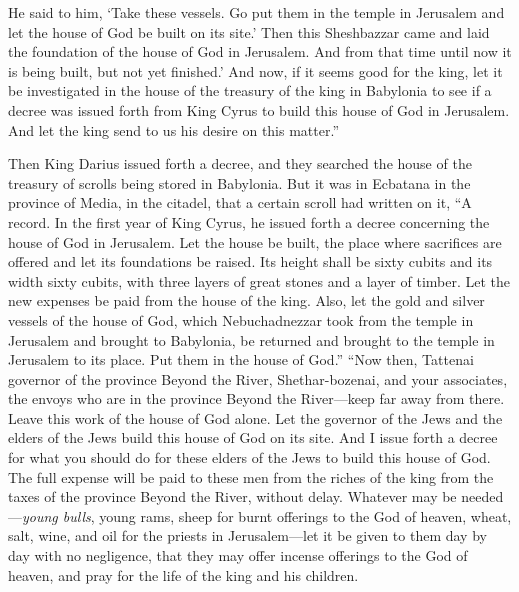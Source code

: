 \begin{biblechapter}
\verse He said to him, ‘Take these vessels. Go put them in the temple in Jerusalem and let the house of God be built on its site.’
\verse Then this Sheshbazzar came and laid the foundation of the house of God in Jerusalem. And from that time until now it is being built, but not yet finished.’
\verse And now, if it seems good for the king, let it be investigated in the house of the treasury of the king in Babylonia to see if a decree was issued forth from King Cyrus to build this house of God in Jerusalem. And let the king send to us his desire on this matter.”
\end{biblechapter}

\begin{biblechapter} %
 Then King Darius issued forth a decree, and they searched the house of the treasury of scrolls being stored in Babylonia.
\verse But it was in Ecbatana in the province of Media, in the citadel, that a certain scroll had written on it, “A record.
\verse In the first year of King Cyrus, he issued forth a decree concerning the house of God in Jerusalem. Let the house be built, the place where sacrifices are offered and let its foundations be raised. Its height shall be sixty cubits and its width sixty cubits,
\verse with three layers of great stones and a layer of timber. Let the new expenses be paid from the house of the king.
\verse Also, let the gold and silver vessels of the house of God, which Nebuchadnezzar took from the temple in Jerusalem and brought to Babylonia, be returned and brought to the temple in Jerusalem to its place. Put them in the house of God.”
 “Now then, Tattenai governor of the province Beyond the River, Shethar-bozenai, and your associates, the envoys who are in the province Beyond the River—keep far away from there.
\verse Leave this work of the house of God alone. Let the governor of the Jews and the elders of the Jews build this house of God on its site.
\verse And I issue forth a decree for what you should do for these elders of the Jews to build this house of God. The full expense will be paid to these men from the riches of the king from the taxes of the province Beyond the River, without delay.
\verse Whatever may be needed—\textit{young bulls}, young rams, sheep for burnt offerings to the God of heaven, wheat, salt, wine, and oil for the priests in Jerusalem—let it be given to them day by day with no negligence,
\verse that they may offer incense offerings to the God of heaven, and pray for the life of the king and his children.

\end{biblechapter}
